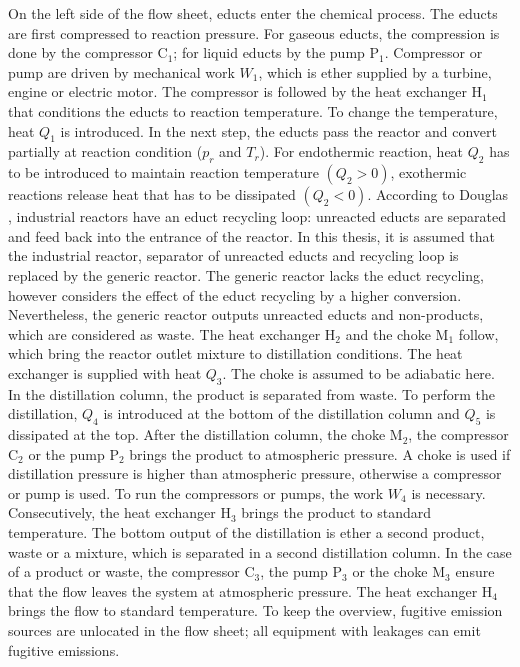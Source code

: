 On the left side of the flow sheet, educts enter the chemical process. The educts are first compressed to reaction pressure. For gaseous educts, the compression is done by the compressor C$_1$; for liquid educts by the pump P$_1$. Compressor or pump are driven by mechanical work $W_1$, which is ether supplied by a turbine, engine or electric motor. The compressor is followed by the heat exchanger H$_1$ that conditions the educts to reaction temperature. To change the temperature, heat $Q_1$ is introduced. In the next step, the educts pass the reactor and convert partially at reaction condition ($p_r$ and $T_r$). For endothermic reaction, heat $Q_2$ has to be introduced to maintain reaction temperature $(Q_2>0)$, exothermic reactions release heat that has to be dissipated $(Q_2<0)$. According to Douglas \cite{Douglas.1985}, industrial reactors have an educt recycling loop: unreacted educts are separated and feed back into the entrance of the reactor. In this thesis, it is assumed that the industrial reactor, separator of unreacted educts and recycling loop is replaced by the generic reactor. The generic reactor lacks the educt recycling, however considers the effect of the educt recycling by a higher conversion. Nevertheless, the generic reactor outputs unreacted educts and non-products, which are considered as waste. The heat exchanger H$_2$ and the choke M$_1$ follow, which bring the reactor outlet mixture to distillation conditions. The heat exchanger is supplied with heat $Q_3$. The choke is assumed to be adiabatic here. In the distillation column, the product is separated from waste. To perform the distillation, $Q_4$ is introduced at the bottom of the distillation column and $Q_5$ is dissipated at the top. After the distillation column, the choke M$_2$, the compressor C$_2$ or the pump P$_2$ brings the product to atmospheric pressure. A choke is used if distillation pressure is higher than atmospheric pressure, otherwise a compressor or pump is used. To run the compressors or pumps, the work $W_4$ is necessary. Consecutively, the heat exchanger H$_3$ brings the product to standard temperature. The bottom output of the distillation is ether a second product, waste or a mixture, which is separated in a second distillation column. In the case of a product or waste, the compressor C$_3$, the pump P$_3$ or the choke M$_3$ ensure that the flow leaves the system at atmospheric pressure. The heat exchanger H$_4$ brings the flow to standard temperature.  To keep the overview, fugitive emission sources are unlocated in the flow sheet; all equipment with leakages can emit fugitive emissions. 


